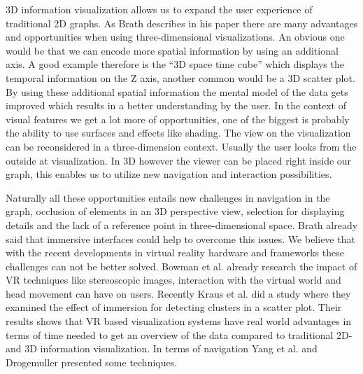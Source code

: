 3D information visualization allows us to expand the user experience of traditional 2D graphs. As Brath describes in his paper \cite{brath_3d_2014} there are many advantages and opportunities when using three-dimensional visualizations.
An obvious one would be that we can encode more spatial information by using an additional axis. A good example therefore is the “3D space time cube” which displays the temporal information on the Z axis, another common would be a 3D scatter plot. By using these additional spatial information the mental model of the data gets improved which results in a better understanding by the user.
In the context of visual features we get a lot more of opportunities, one of the biggest is probably the ability to use surfaces and effects like shading. 
The view on the visualization can be reconsidered in a three-dimension context. Usually the user looks from the outside at visualization. In 3D however the viewer can be placed right inside our graph, this enables us to utilize new navigation and interaction possibilities. 

Naturally all these opportunities entails new challenges in navigation in the graph, occlusion of elements in an 3D perspective view, selection for displaying details and the lack of a reference point in three-dimensional space. Brath \cite{brath_3d_2014} already said that immersive interfaces could help to overcome this issues. We believe that with the recent developments in virtual reality hardware and frameworks these challenges can not be better solved. Bowman et al. \cite{bowman_virtual_2007} already research the impact of VR techniques like stereoscopic images, interaction with the virtual world and head movement can have on users. Recently Kraus et al. \cite{kraus_impact_2020} did a study where they examined the effect of immersion for detecting clusters in a scatter plot. Their results shows that VR based visualization systems have real world advantages in terms of time needed to get an overview of the data compared to traditional 2D- and 3D information visualization. In terms of navigation Yang et al. \cite{yang_embodied_2020} and Drogemuller \cite{drogemuller_examining_2020} presented some techniques.  



